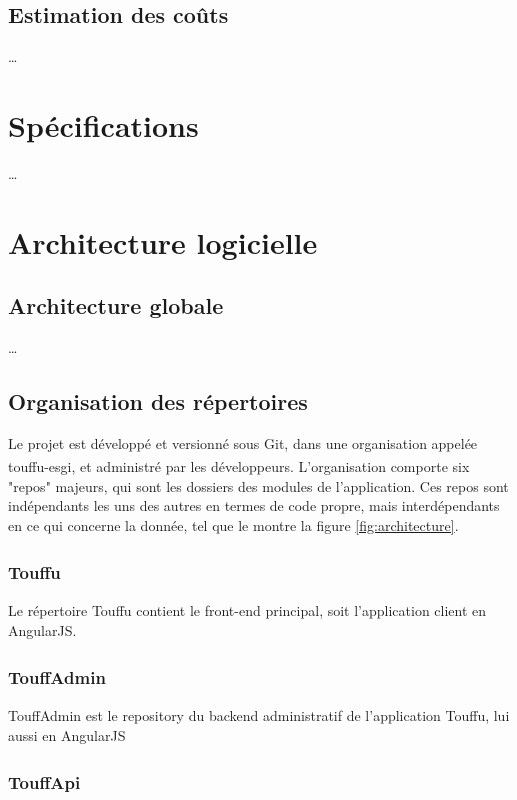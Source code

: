\documentclass[conference]{IEEEtran}
\newcommand{\bibRef}[1]
{\textsuperscript{\cite{#1}}}
\begin{document}
\subsection{Estimation des coûts}
…

\section{Spécifications}
…

\section{Architecture logicielle}

\subsection{Architecture globale}

…

\subsection{Organisation des répertoires}

Le projet est développé et versionné sous Git, dans une organisation appelée touffu-esgi\bibRef{touffu-esgi}, et administré par les développeurs. L'organisation comporte six "repos" majeurs, qui sont les dossiers des modules de l'application. Ces repos sont indépendants les uns des autres en termes de code propre, mais interdépendants en ce qui concerne la donnée, tel que le montre la figure \ref{fig:architecture}.\\

\subsubsection*{Touffu\bibRef{Touffu} }

Le répertoire Touffu contient le front-end principal, soit l'application client en AngularJS.\\

\subsubsection*{TouffAdmin\bibRef{TouffAdmin} }

TouffAdmin est le repository du backend administratif de l'application Touffu, lui aussi en AngularJS\\

\subsubsection*{TouffApi\bibRef{TouffApi} }
\end{document}
